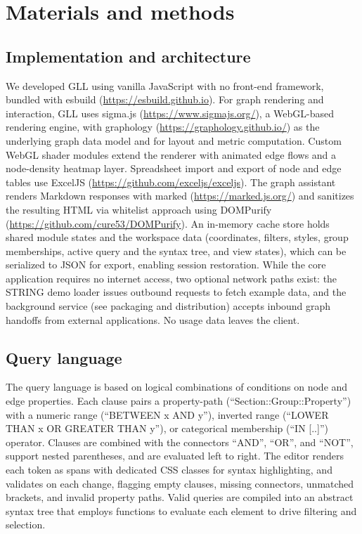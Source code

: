 \section{Materials and methods}

\subsection{Implementation and architecture}
We developed GLL using vanilla JavaScript with no front-end framework, bundled with esbuild (\url{https://esbuild.github.io}). For graph rendering and interaction, GLL uses sigma.js (\url{https://www.sigmajs.org/}), a WebGL-based rendering engine, with graphology (\url{https://graphology.github.io/}) as the underlying graph data model and for layout and metric computation. Custom WebGL shader modules extend the renderer with animated edge flows and a node-density heatmap layer. Spreadsheet import and export of node and edge tables use ExcelJS (\url{https://github.com/exceljs/exceljs}). The graph assistant renders Markdown responses with marked (\url{https://marked.js.org/}) and sanitizes the resulting HTML via whitelist approach using DOMPurify (\url{https://github.com/cure53/DOMPurify}). An in-memory cache store holds shared module states and the workspace data (coordinates, filters, styles, group memberships, active query and the syntax tree, and view states), which can be serialized to JSON for export, enabling session restoration. While the core application requires no internet access, two optional network paths exist: the STRING demo loader issues outbound requests to fetch example data, and the background service (see packaging and distribution) accepts inbound graph handoffs from external applications. No usage data leaves the client.

\subsection{Query language}
The query language is based on logical combinations of conditions on node and edge properties. Each clause pairs a property-path (``Section::Group::Property'') with a numeric range (``BETWEEN x AND y''), inverted range (``LOWER THAN x OR GREATER THAN y''), or categorical membership (``IN [..]'') operator. Clauses are combined with the connectors ``AND'', ``OR'', and ``NOT'', support nested parentheses, and are evaluated left to right. The editor renders each token as spans with dedicated CSS classes for syntax highlighting, and validates on each change, flagging empty clauses, missing connectors, unmatched brackets, and invalid property paths. Valid queries are compiled into an abstract syntax tree that employs functions to evaluate each element to drive filtering and selection.


